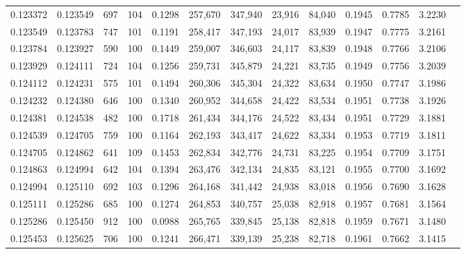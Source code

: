 \begin{tabular}{rrrrrrrrrrrrr}
0.123372 & 0.123549 &   697 & 104 &                                     0.1298 & 257,670 & 347,940 &  23,916 &  84,040 & 0.1945 & 0.7785 & 3.2230 \\
0.123549 & 0.123783 &   747 & 101 &                                     0.1191 & 258,417 & 347,193 &  24,017 &  83,939 & 0.1947 & 0.7775 & 3.2161 \\
0.123784 & 0.123927 &   590 & 100 &                                     0.1449 & 259,007 & 346,603 &  24,117 &  83,839 & 0.1948 & 0.7766 & 3.2106 \\
0.123929 & 0.124111 &   724 & 104 &                                     0.1256 & 259,731 & 345,879 &  24,221 &  83,735 & 0.1949 & 0.7756 & 3.2039 \\
0.124112 & 0.124231 &   575 & 101 &                                     0.1494 & 260,306 & 345,304 &  24,322 &  83,634 & 0.1950 & 0.7747 & 3.1986 \\
0.124232 & 0.124380 &   646 & 100 &                                     0.1340 & 260,952 & 344,658 &  24,422 &  83,534 & 0.1951 & 0.7738 & 3.1926 \\
0.124381 & 0.124538 &   482 & 100 &                                     0.1718 & 261,434 & 344,176 &  24,522 &  83,434 & 0.1951 & 0.7729 & 3.1881 \\
0.124539 & 0.124705 &   759 & 100 &                                     0.1164 & 262,193 & 343,417 &  24,622 &  83,334 & 0.1953 & 0.7719 & 3.1811 \\
0.124705 & 0.124862 &   641 & 109 &                                     0.1453 & 262,834 & 342,776 &  24,731 &  83,225 & 0.1954 & 0.7709 & 3.1751 \\
0.124863 & 0.124994 &   642 & 104 &                                     0.1394 & 263,476 & 342,134 &  24,835 &  83,121 & 0.1955 & 0.7700 & 3.1692 \\
0.124994 & 0.125110 &   692 & 103 &                                     0.1296 & 264,168 & 341,442 &  24,938 &  83,018 & 0.1956 & 0.7690 & 3.1628 \\
0.125111 & 0.125286 &   685 & 100 &                                     0.1274 & 264,853 & 340,757 &  25,038 &  82,918 & 0.1957 & 0.7681 & 3.1564 \\
0.125286 & 0.125450 &   912 & 100 &                                     0.0988 & 265,765 & 339,845 &  25,138 &  82,818 & 0.1959 & 0.7671 & 3.1480 \\
0.125453 & 0.125625 &   706 & 100 &                                     0.1241 & 266,471 & 339,139 &  25,238 &  82,718 & 0.1961 & 0.7662 & 3.1415 \\

\end{tabular}
